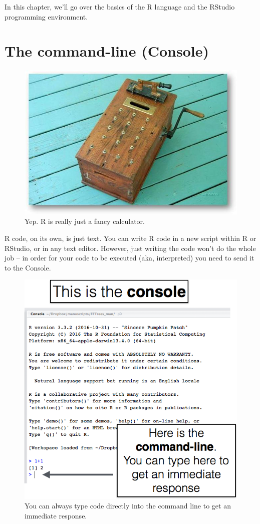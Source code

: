 \documentclass[
]{book}
\begin{document}
In this chapter, we'll go over the basics of the R language and the RStudio programming environment.

\hypertarget{BASICS-CONSOLE}{%
\section{The command-line (Console)}\label{BASICS-CONSOLE}}

\begin{figure}

{\centering \includegraphics[width=0.5\linewidth]{images/chapter-2/woodcalc} 

}

\caption{Yep. R is really just a fancy calculator.}\label{fig:unnamed-chunk-19}
\end{figure}

R code, on its own, is just text. You can write R code in a new script within R or RStudio, or in any text editor. However, just writing the code won't do the whole job -- in order for your code to be executed (aka, interpreted) you need to send it to the Console.

\begin{figure}

{\centering \includegraphics[width=0.75\linewidth]{images/chapter-2/commandline} 

}

\caption{You can always type code directly into the command line to get an immediate response.}\label{fig:unnamed-chunk-20}
\end{figure}
\end{document}
